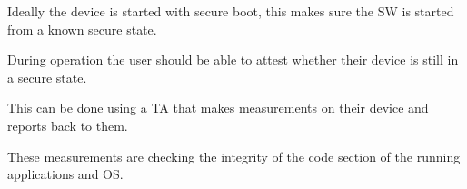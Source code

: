 \documentclass{report}
\begin{document}
Ideally the device is started with secure boot, this makes sure the SW is started from a known secure state. 
\medskip

During operation the user should be able to attest whether their device is still in a secure state.
\medskip

This can be done using a TA that makes measurements on their device and reports back to them.
\medskip

These measurements are checking the integrity of the code section of the running applications and OS.
\end{document}
